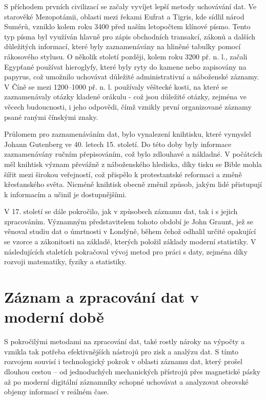 S příchodem prvních civilizací se začaly vyvíjet lepší metody uchovávání dat. Ve starověké Mezopotámii, oblasti mezi řekami Eufrat a Tigris, kde sídlil národ 
Sumérů, vzniklo kolem roku 3400 před naším letopočtem klínové písmo. Tento typ písma byl využíván hlavně pro zápis obchodních transakcí, zákonů a dalších 
důležitých informací, které byly zaznamenávány na hliněné tabulky pomocí rákosového stylusu. O několik století později, kolem roku 3200 př. n. l., začali 
Egypťané používat hieroglyfy, které byly ryty do kamene nebo zapisovány na papyrus, což umožnilo uchovávat důležité administrativní a náboženské záznamy. 
V Číně se mezi 1200–1000 př. n. l. používaly věštecké kosti, na které se zaznamenávaly otázky kladené orákulu - což jsou důležité otázky, zejména ve věcech 
budoucnosti, i jeho odpovědi, čímž vznikly první organizované záznamy psané ranými čínskými znaky.

\newpage

Průlomem pro zaznamenáváním dat, bylo vynalezení knihtisku, které vymyslel Johann Gutenberg ve 40. letech 15. století. Do této doby byly informace 
zaznamenávány ručním přepisováním, což bylo zdlouhavé a nákladné. V počátcích měl knihtisk význam převážně z náboženského hlediska, díky tisku se Bible mohla 
šířit mezi širokou veřejností, což přispělo k protestantské reformaci a změně křesťanského světa. Nicméně knihtisk obecně změnil způsob, jakým lidé přistupují 
k informacím a učinil je dostupnějšími. \cite{knihtisk_medium}

V 17. století se dále pokročilo, jak v způsobech záznamu dat, tak i s jejich zpracováním. Významným představitelem tohoto období je John Graunt, jež se 
věnoval studiu dat o úmrtnosti v Londýně, během čehož odhalil určité opakující se vzorce a zákonitosti na základě, kterých položil základy moderní statistiky. 
V následujících staletích pokračoval vývoj metod pro práci s daty, zejména díky rozvoji matematiky, fyziky a statistiky. \cite{britanicca_John_Graunt}
\section{Záznam a zpracování dat v moderní době}
S pokročilými metodami na zpracování dat, také rostly nároky na výpočty a vznikla tak potřeba efektivnějších nástrojů pro zisk a analýzu dat. S tímto rozvojem 
souvisí i technologický pokrok v oblasti záznamu dat, který prošel dlouhou cestou – od jednoduchých mechanických přístrojů přes magnetické pásky až po moderní 
digitální záznamníky schopné uchovávat a analyzovat obrovské objemy informací v reálném čase.

